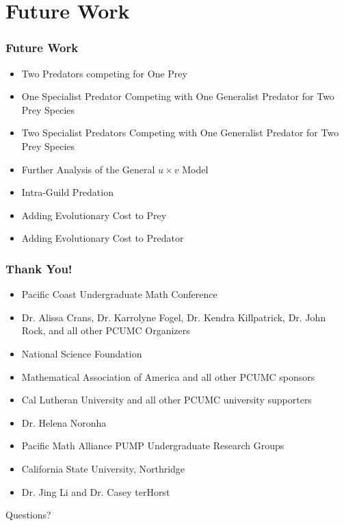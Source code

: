 \documentclass[10pt]{beamer}
\begin{document}
\section{Future Work}
\begin{frame}
	\frametitle{Future Work}
	\begin{itemize}
		\item Two Predators competing for One Prey
		\item One Specialist Predator Competing with One Generalist Predator for Two Prey Species
		\item Two Specialist Predators Competing with One Generalist Predator for Two Prey Species
		\item Further Analysis of the General $u \times v$ Model
		\item Intra-Guild Predation
		\item Adding Evolutionary Cost to Prey
		\item Adding Evolutionary Cost to Predator
	\end{itemize}
\end{frame}

\begin{frame}
	\frametitle{Thank You!}
	\begin{itemize}
		\item Pacific Coast Undergraduate Math Conference
		\item Dr. Alissa Crans, Dr. Karrolyne Fogel, Dr. Kendra Killpatrick, Dr. John Rock, and all other PCUMC Organizers
		\item National Science Foundation
		\item Mathematical Association of America and all other PCUMC sponsors
		\item Cal Lutheran University and all other PCUMC university supporters
		\item Dr. Helena Noronha
		\item Pacific Math Alliance PUMP Undergraduate Research Groups
		\item California State University, Northridge
		\item Dr. Jing Li and Dr. Casey terHorst
	\end{itemize}
	\begin{center}
		{\Huge Questions?}
	\end{center}
\end{frame}
\end{document}
